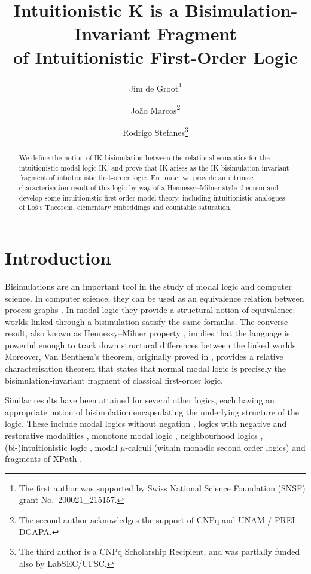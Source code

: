 \documentclass[submission,copyright,creativecommons]{eptcs}
\title{Intuitionistic K is a Bisimulation-Invariant Fragment\\ of Intuitionistic First-Order Logic}
\author{%
  Jim de Groot\footnote{The first author was supported by Swiss National Science Foundation (SNSF) grant No.~200021\_215157.}
  \institute{University of Bern\\ Bern, Switzerland}
  \email{jim.degroot@unibe.ch}
\and
  Jo{\~a}o Marcos\footnote{The second author acknowledges the support of CNPq and UNAM / PREI DGAPA.}
  \institute{Universidade Federal de Santa Catarina\\ Florian\'opolis, Brazil}
  \email{botocudo@gmail.com}
\and
  Rodrigo Stefanes\footnote{The third author is a CNPq Scholarship Recipient, and was partially funded also by LabSEC/UFSC.}
  \institute{Universidade Federal de Santa Catarina\\ Florian\'opolis, Brazil}
  \email{rodrigoamstefanes@gmail.com}
}
\begin{document}
\maketitle


\begin{abstract}
  We define the notion of IK-bi\-si\-mu\-la\-tion between the relational semantics
  for the intuitionistic modal logic IK, and prove that IK arises
  as the IK-bi\-si\-mu\-la\-tion-invariant fragment of intuitionistic first-order logic.
  En route, we provide an intrinsic characterisation result of this logic by way of a
  Hennessy--Milner-style theorem and develop
  some intuitionistic first-order model theory, including 
  intuitionistic analogues of {\L}o\'{s}'s Theorem,
  elementary embeddings and countable saturation.
\end{abstract}





\section{Introduction}

Bisimulations are an important tool in the study of modal logic and computer science. In computer science, they can be used as an equivalence relation between process graphs \cite{Mil80,Park81}. In modal logic they provide a structural notion of equivalence: worlds linked through a bisimulation satisfy the same formulas. The converse result, also known as Hennessy--Milner property \cite{HenMil85}, implies that the language is powerful enough to track down structural differences between the linked worlds.
Moreover, Van Benthem's theorem, originally proved in \cite{VBen76}, provides a relative characterisation theorem that states that normal modal logic is precisely the bisimulation-invariant fragment of classical first-order logic.

Similar results have been attained for several other logics, each having an appropriate notion of bisimulation encapsulating the underlying structure of the logic. These include modal logics without negation \cite{KurRij97}, logics with negative and restorative modalities \cite{GroMarSte25},
monotone modal logic \cite{Han03},
neighbourhood logics \cite{Han09},
(bi-)intuitionistic logic \cite{Bad16, GrootPatt19, Olk13, Pat97},
modal $\mu$-calculi (within monadic second order logics) \cite{EnqSeiVen19,JanWalu95} and fragments of XPath \cite{AbrioDescFig17, FigAre15, TenBalLit10}. 
\end{document}

